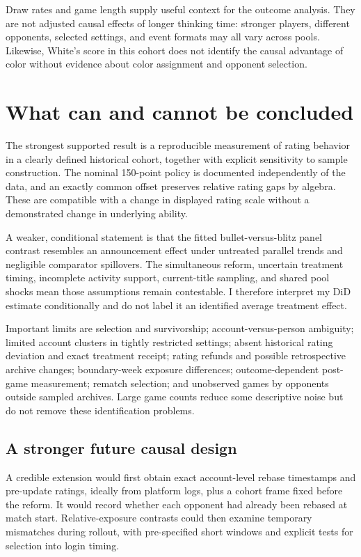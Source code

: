 \documentclass[11pt,a4paper]{article}
\begin{document}
Draw rates and game length supply useful context for the outcome analysis. They are not adjusted causal effects of longer thinking time: stronger players, different opponents, selected settings, and event formats may all vary across pools. Likewise, White's score in this cohort does not identify the causal advantage of color without evidence about color assignment and opponent selection.

\section{What can and cannot be concluded}

The strongest supported result is a reproducible measurement of rating behavior in a clearly defined historical cohort, together with explicit sensitivity to sample construction. The nominal 150-point policy is documented independently of the data, and an exactly common offset preserves relative rating gaps by algebra. These are compatible with a change in displayed rating scale without a demonstrated change in underlying ability.

A weaker, conditional statement is that the fitted bullet-versus-blitz panel contrast resembles an announcement effect under untreated parallel trends and negligible comparator spillovers. The simultaneous reform, uncertain treatment timing, incomplete activity support, current-title sampling, and shared pool shocks mean those assumptions remain contestable. I therefore interpret my DiD estimate conditionally and do not label it an identified average treatment effect.

Important limits are selection and survivorship; account-versus-person ambiguity; limited account clusters in tightly restricted settings; absent historical rating deviation and exact treatment receipt; rating refunds and possible retrospective archive changes; boundary-week exposure differences; outcome-dependent post-game measurement; rematch selection; and unobserved games by opponents outside sampled archives. Large game counts reduce some descriptive noise but do not remove these identification problems.

\subsection{A stronger future causal design}

A credible extension would first obtain exact account-level rebase timestamps and pre-update ratings, ideally from platform logs, plus a cohort frame fixed before the reform. It would record whether each opponent had already been rebased at match start. Relative-exposure contrasts could then examine temporary mismatches during rollout, with pre-specified short windows and explicit tests for selection into login timing.
\end{document}
